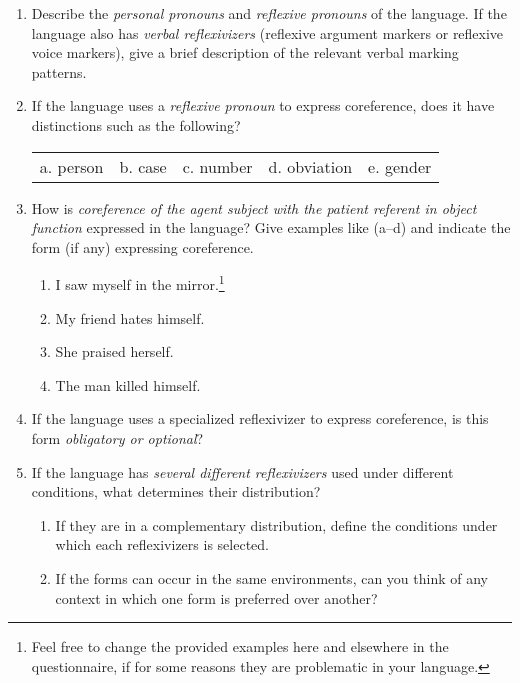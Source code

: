 \documentclass[output=paper]{langscibook}
\begin{document}
\begin{enumerate}
\item Describe the \textit{personal pronouns} and \textit{reflexive pronouns} of the language. If the language also has \textit{verbal reflexivizers} (reflexive argument markers or reflexive voice markers), give a brief description of the relevant verbal marking patterns. 
\item  If the language uses a \textit{reflexive pronoun} to express coreference, does it have distinctions such as the following?\smallskip\\
\begin{tabularx}{\linewidth}{*5{Q}}
a. person  &  b. case &   c. number &  d. obviation  &  e. gender 
\end{tabularx}

\item  How is \textit{coreference of the agent subject with the patient referent in object function} expressed in the language? Give examples like (a--d) and indicate the form (if any) expressing coreference.
  \begin{enumerate}[label=\alph*.]
  \item I saw myself in the mirror.\footnote{Feel free to change the provided examples here and elsewhere in the questionnaire, if for some reasons they are problematic in your language.}  
  \item My friend hates himself. 
  \item She praised herself. 
  \item The man killed himself. 
  \end{enumerate}

\item If the language uses a specialized reflexivizer to express coreference, is this form \textit{obligatory or optional}? 

\item If the language has \textit{several different reflexivizers} used under different conditions, what determines their distribution? 
     \begin{enumerate}[label=\alph*.]
      \item If they are in a complementary distribution, define the conditions under which each reflexivizers is selected. 
      \item  If the forms can occur in the same environments, can you think of any context in which one form is preferred over another? 
     \end{enumerate}
\end{enumerate}
\end{document}
